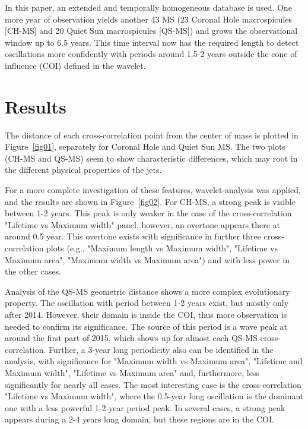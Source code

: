 \documentclass[final,authoryear,5p]{elsarticle}
\begin{document}
In this paper, an extended and temporally homogeneous database is used. One more year of observation yields another 43 MS (23 Coronal Hole macrospicules [CH-MS] and 20 Quiet Sun macrospicules [QS-MS]) and grows the observational window up to 6.5 years. This time interval now has the required length to detect oscillations more confidently with periods around 1.5-2 years outside the cone of influence (COI) defined in the wavelet.

\section{Results}
The distance of each cross-correlation point from the center of mass is plotted in Figure~\ref{fig01}, separately for Coronal Hole and Quiet Sun MS. The two plots (CH-MS and QS-MS) seem to show characteristic differences, which may root in the different physical properties of the jets. 

For a more complete investigation of these features, wavelet-analysis was applied, and the results are shown in Figure~\ref{fig02}. For CH-MS, a strong peak is visible between 1-2 years. This peak is only weaker in the case of the cross-correlation "Lifetime vs Maximum width" panel, however, an overtone appears there at around 0.5 year. This overtone exists with significance in further three cross-correlation plots (e.g., "Maximum length vs Maximum width", "Lifetime vs Maximum area", "Maximum width vs Maximum area") and with less power in the other cases. 

Analysis of the QS-MS geometric distance shows a more complex evolutionary property. The oscillation with period between 1-2 years exist, but mostly only after 2014. However, their domain is inside the COI, thus more observation is needed to confirm its significance. The source of this period is a wave peak at around the first part of 2015, which shows up for almost each QS-MS cross-correlation. Further, a 3-year long periodicity also can be identified in the analysis, with significance for "Maximum width vs Maximum area", "Lifetime and Maximum width", "Lifetime vs Maximum area" and, furthermore, less significantly for nearly all cases. The most interesting case is the cross-correlation "Lifetime vs Maximum width", where the 0.5-year long oscillation is the dominant one with a less powerful 1-2-year period peak. In several cases, a strong peak appears during a 2-4 years long domain, but these regions are in the COI.
\end{document}
